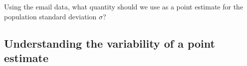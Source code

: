 \begin{exercisewrap}
\begin{nexercise}Using the email data, what quantity should we use as a point estimate for the population standard deviation $\sigma$?\footnotemark
\end{nexercise}
\end{exercisewrap}



%


\subsection{Understanding the variability of a point estimate}
\label{simulationForUnderstandingVariabilitySection}

\newcommand{\pewsolarpollsize}{1000}
\newcommand{\pewsolarparprop}{0.88}
\newcommand{\pewsolarparpropcomplement}{0.12}
\newcommand{\pewsolarparpercent}{88\%}
\newcommand{\pewsolarparpercentcomplement}{12\%}
\newcommand{\pewsolarpollprop}{0.887}
\newcommand{\pewsolarpollpropcomplement}{0.113}
\newcommand{\pewsolarpollpercent}{88.7\%}
\newcommand{\pewsolarpollpercentcomplement}{11.3\%}
\newcommand{\pewsolarpollcount}{887}
\newcommand{\pewsolarpollexpcount}{880}
\newcommand{\pewsolarpollcountcomplement}{113}
\newcommand{\pewsolarpollexpcountcomplement}{120}
\newcommand{\pewsolarpollse}{0.010}


